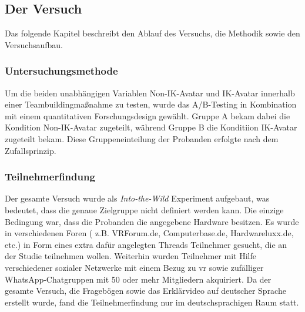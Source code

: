 \documentclass[a4paper,11pt]{article}%
\renewcommand{\\}{\vspace*{0.5\baselineskip} \newline}
\begin{document}
\subsection{Der Versuch}
	
Das folgende Kapitel beschreibt den Ablauf des Versuchs, die Methodik sowie den Versuchsaufbau.

\subsubsection{Untersuchungsmethode}
Um die beiden unabhängigen Variablen \dq{}Non-IK-Avatar\dq{} und \dq{}IK-Avatar\dq{} innerhalb einer Teambuildingmaßnahme zu testen, wurde das A/B-Testing in Kombination mit einem quantitativen Forschungsdesign gewählt.
Gruppe A bekam dabei die Kondition \dq{}Non-IK-Avatar\dq{} zugeteilt, während Gruppe B die Konditiion \dq{}IK-Avatar\dq{} zugeteilt bekam. Diese Gruppeneinteilung der Probanden erfolgte nach dem Zufallsprinzip. 

	\subsubsection{Teilnehmerfindung}
Der gesamte Versuch wurde als \textit{Into-the-Wild} Experiment aufgebaut, was bedeutet, dass die genaue Zielgruppe nicht definiert werden kann. Die einzige Bedingung war, dass die Probanden die angegebene Hardware besitzen. Es wurde in verschiedenen Foren ( z.B. VRForum.de, Computerbase.de, Hardwareluxx.de, etc.) in Form eines extra dafür angelegten Threads Teilnehmer gesucht, die an der Studie teilnehmen wollen. Weiterhin wurden Teilnehmer mit Hilfe verschiedener sozialer Netzwerke mit einem Bezug zu \ac{vr} sowie zufälliger WhatsApp-Chatgruppen mit 50 oder mehr Mitgliedern akquiriert. Da der gesamte Versuch, die Fragebögen sowie das Erklärvideo auf deutscher Sprache erstellt wurde, fand die Teilnehmerfindung nur im deutschsprachigen Raum statt.
\end{document}
